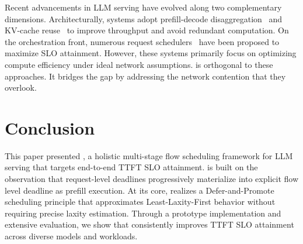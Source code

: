  Recent advancements in LLM serving have evolved along two complementary dimensions. Architecturally, systems adopt prefill-decode disaggregation~\cite{distserve,splitwise} and KV-cache reuse~\cite{mooncakefast,cachedattention} to improve throughput and avoid redundant computation. On the orchestration front, numerous request schedulers~\cite{thunderserve,stojkovic2025dynamollm,chen2025slos,hongsola,tempo2025} have been proposed to maximize SLO attainment. However, these systems primarily focus on optimizing compute efficiency under ideal network assumptions. \sys is orthogonal to these approaches. It bridges the gap by addressing the network contention that they overlook.

\section{Conclusion}
This paper presented \sys{}, a holistic multi-stage flow scheduling framework for LLM serving that targets end-to-end TTFT SLO attainment. \sys{} is built on the observation that request-level deadlines progressively materialize into explicit flow level deadline as prefill execution. At its core, \sys{} realizes a Defer-and-Promote scheduling principle that approximates Least-Laxity-First behavior without requiring precise laxity estimation. Through a prototype implementation and extensive evaluation, we show that \sys{} consistently improves TTFT SLO attainment across diverse models and workloads.
